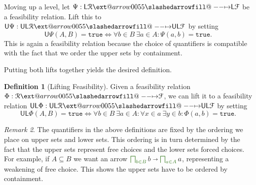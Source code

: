 \documentclass[12pt]{article}
\makeatletter
\theoremstyle{definition}
\newtheorem{definition}{Definition}[section]
\theoremstyle{plain}
\theoremstyle{plain}
\theoremstyle{plain}
\theoremstyle{plain}
\theoremstyle{remark}
\theoremstyle{remark}
\newtheorem{remark}[definition]{Remark}
\newcommand{\mc}[1]{\mathcal{#1}}
\newcommand{\sub}{\subseteq}
\newcommand{\low}{\mathsf{L}}
\newcommand{\upper}{\mathsf{U}}
\newcommand{\true}{\mathtt{true}}
\def\slashedarrowfill@#1#2#3#4#5{%
	$\m@th\thickmuskip0mu\medmuskip\thickmuskip\thinmuskip\thickmuskip
	\relax#5#1\mkern-7mu%
	\cleaders\hbox{$#5\mkern-2mu#2\mkern-2mu$}\hfill
	\mathclap{#3}\mathclap{#2}%
	\cleaders\hbox{$#5\mkern-2mu#2\mkern-2mu$}\hfill
	\mkern-7mu#4$%
}
\def\rightslashedarrowfill@{%
	\slashedarrowfill@\relbar\relbar\mapstochar\rightarrow}
\newcommand\xslashedrightarrow[2][]{%
	\ext@arrow 0055{\rightslashedarrowfill@}{#1}{#2}}
\newcommand{\cbigsqcap}[1]{\color{OliveGreen}\bigsqcap_{#1}\color{Black}}
\makeatother
\begin{document}
Moving up a level, let $\Psi: \low\mc{R} \xslashedrightarrow{} \low\mc{F}$ be a feasibility relation. Lift this to $\upper\Psi: \upper\low\mc{R} \xslashedrightarrow{} \upper\low\mc{F}$ by setting  
$$\upper\Psi(A,B) = \true \iff \forall b \in B \: \exists a \in A: \Psi(a,b)=\true.$$
This is again a feasibility relation because the choice of quantifiers is compatible with the fact that we order the upper sets by containment. 

Putting both lifts together yields the desired definition.

\begin{definition}[Lifting Feasibility]\label{def:lift feas}
	 Given a feasibility relation $\Phi: \mc{R} \xslashedrightarrow{} \mc{F}$, we can lift it to a feasibility relation $\upper\low\Phi: \upper\low\mc{R} \xslashedrightarrow{} \upper\low\mc{F}$ by setting
	$$ \upper\low\Phi(A,B) = \true \iff \forall b \in B \: \exists a \in A: \forall x \in a \: \exists y \in b: \Phi(a,b) = \true.$$
\end{definition}

\begin{remark}
	The quantifiers in the above definitions are fixed by the ordering we place on upper sets and lower sets. This ordering is in turn determined by the fact that the upper sets represent free choices and the lower sets forced choices. For example, if $A \sub B$ we want an arrow $\cbigsqcap{b \in B} b \shortrightarrow \cbigsqcap{a \in A} a$, representing a weakening of free choice. This shows the upper sets have to be ordered by containment.
\end{remark}
\end{document}
